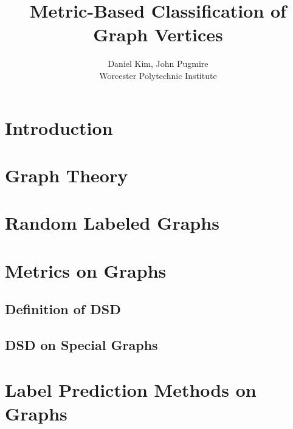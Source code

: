 \documentclass[11pt,oneside]{report}
\theoremstyle{definition}
\begin{document}
\title{Metric-Based Classification of Graph Vertices}
\author{Daniel Kim, John Pugmire\\Worcester Polytechnic Institute\\}
\maketitle
\tableofcontents


\chapter{Introduction}

\chapter{Graph Theory}

% 



\chapter{Random Labeled Graphs}



\chapter{Metrics on Graphs}

\section{Definition of DSD}


\section{DSD on Special Graphs}



\chapter{Label Prediction Methods on Graphs}

\end{document}
